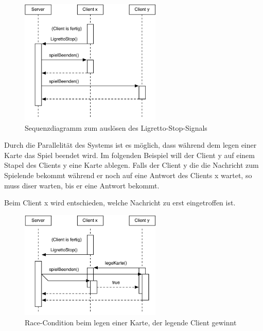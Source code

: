 \begin{figure}[H]
  \centering
  \includegraphics[width=0.60\textwidth,angle=0]{graphics/LigrettoStop.pdf}
  \caption{Sequenzdiagramm zum auslösen des Ligretto-Stop-Signals\hfill{} }
  \label{LigrettoStop}
\end{figure}

Durch die Parallelität des Systems ist es möglich, dass während dem legen einer Karte das Spiel beendet wird. Im folgenden Beispiel will der Client y auf einem Stapel des Clients y eine Karte ablegen. Falls der Client y die die Nachricht zum Spielende bekommt während er noch auf eine Antwort des Clients x wartet, so muss diser warten, bis er eine Antwort bekommt.

Beim Client x wird entschieden, welche Nachricht zu erst eingetroffen ist.

\begin{figure}[H]
  \centering
  \includegraphics[width=0.60\textwidth,angle=0]{graphics/LigrettoStop_Kollision_A.pdf}
  \caption{Race-Condition beim legen einer Karte, der legende Client gewinnt\hfill{} }
  \label{LigrettoStop_Kollision_A}
\end{figure}

